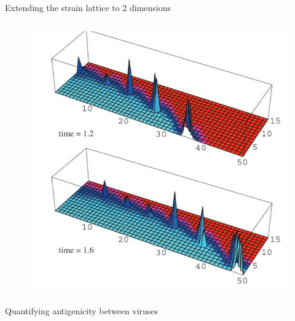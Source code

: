 \documentclass{beamer}
\begin{document}
\begin{frame}{Extending the strain lattice to 2 dimensions}
\begin{columns}
\begin{column}{0.5\textwidth}
\begin{figure}
                \includegraphics[width=\textwidth]{gog_2d_fig/gog_2d_b.png}
            \end{figure}
        \end{column}
    \end{columns}
    \centering
    \vfill
    \tiny{\cite{gogDynamicsSelectionManystrain2002}}

\end{frame}


\begin{frame}{Quantifying antigenicity between viruses}
    \begin{figure}
        \centering
        \scalebox{0.9}{
        
        }
    \end{figure}
\end{frame}
\end{document}
